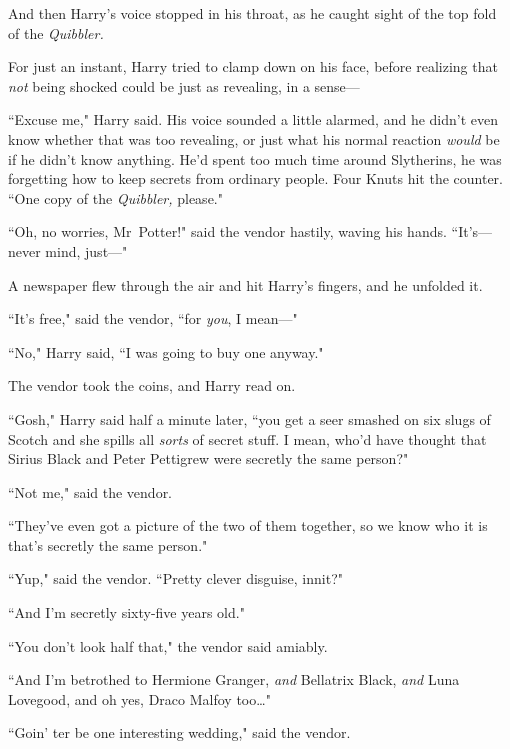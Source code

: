 And then Harry's voice stopped in his throat, as he caught sight of the top fold of the \emph{Quibbler.}


For just an instant, Harry tried to clamp down on his face, before realizing that \emph{not} being shocked could be just as revealing, in a sense—

``Excuse me," Harry said. His voice sounded a little alarmed, and he didn't even know whether that was too revealing, or just what his normal reaction \emph{would} be if he didn't know anything. He'd spent too much time around Slytherins, he was forgetting how to keep secrets from ordinary people. Four Knuts hit the counter. ``One copy of the \emph{Quibbler,} please."

``Oh, no worries, Mr~Potter!" said the vendor hastily, waving his hands. ``It's—never mind, just—"

A newspaper flew through the air and hit Harry's fingers, and he unfolded it.


``It's free," said the vendor, ``for \emph{you}, I mean—"

``No," Harry said, ``I was going to buy one anyway."

The vendor took the coins, and Harry read on.

``Gosh," Harry said half a minute later, ``you get a seer smashed on six slugs of Scotch and she spills all \emph{sorts} of secret stuff. I mean, who'd have thought that Sirius Black and Peter Pettigrew were secretly the same person?"

``Not me," said the vendor.

``They've even got a picture of the two of them together, so we know who it is that's secretly the same person."

``Yup," said the vendor. ``Pretty clever disguise, innit?"

``And I'm secretly sixty-five years old."

``You don't look half that," the vendor said amiably.

``And I'm betrothed to Hermione Granger, \emph{and} Bellatrix Black, \emph{and} Luna Lovegood, and oh yes, Draco Malfoy too{\ldots}"

``Goin' ter be one interesting wedding," said the vendor.

